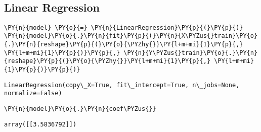     \begin{center}
    \end{center}
    { \hspace*{\fill} \\}

\subsection*{Linear Regression}

    \begin{tcolorbox}[breakable, size=fbox, boxrule=1pt, pad at break*=1mm,colback=cellbackground, colframe=cellborder]
\begin{Verbatim}[commandchars=\\\{\}]
\PY{n}{model} \PY{o}{=} \PY{n}{LinearRegression}\PY{p}{(}\PY{p}{)}
\PY{n}{model}\PY{o}{.}\PY{n}{fit}\PY{p}{(}\PY{n}{X\PYZus{}train}\PY{o}{.}\PY{n}{reshape}\PY{p}{(}\PY{o}{\PYZhy{}}\PY{l+m+mi}{1}\PY{p}{,} \PY{l+m+mi}{1}\PY{p}{)}\PY{p}{,} \PY{n}{Y\PYZus{}train}\PY{o}{.}\PY{n}{reshape}\PY{p}{(}\PY{o}{\PYZhy{}}\PY{l+m+mi}{1}\PY{p}{,} \PY{l+m+mi}{1}\PY{p}{)}\PY{p}{)}
\end{Verbatim}
\end{tcolorbox}

            \begin{tcolorbox}[breakable, size=fbox, boxrule=.5pt, pad at break*=1mm, opacityfill=0]
\begin{Verbatim}[commandchars=\\\{\}]
LinearRegression(copy\_X=True, fit\_intercept=True, n\_jobs=None, normalize=False)
\end{Verbatim}
\end{tcolorbox}
        
    \begin{tcolorbox}[breakable, size=fbox, boxrule=1pt, pad at break*=1mm,colback=cellbackground, colframe=cellborder]
\begin{Verbatim}[commandchars=\\\{\}]
\PY{n}{model}\PY{o}{.}\PY{n}{coef\PYZus{}}
\end{Verbatim}
\end{tcolorbox}

            \begin{tcolorbox}[breakable, size=fbox, boxrule=.5pt, pad at break*=1mm, opacityfill=0]
\begin{Verbatim}[commandchars=\\\{\}]
array([[3.5836792]])
\end{Verbatim}
\end{tcolorbox}

